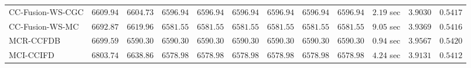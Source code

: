 \begin{table}[H]
\begin{tabular}{lrrrrrrrrrrr}
    CC-Fusion-WS-CGC & $      6609.94$ & $      6604.73$ & $      6596.94$ & $      6596.94$ & $      6596.94$ & $      6596.94$ & $      6596.94$ & $      6596.94$ & $         2.19$ sec    & $       3.9030$  & $       0.5417$ \\ 
     CC-Fusion-WS-MC & $      6692.87$ & $      6619.96$ & $      6581.55$ & $      6581.55$ & $      6581.55$ & $      6581.55$ & $      6581.55$ & $      6581.55$ & $         9.05$ sec    & $       3.9369$  & $       0.5416$ \\ 
\cmidrule{1-1} 
           MCR-CCFDB & $      6699.59$ & $      6590.30$ & $      6590.30$ & $      6590.30$ & $      6590.30$ & $      6590.30$ & $      6590.30$ & $      6590.30$ & $         0.94$ sec    & $       3.9567$  & $       0.5420$ \\ 
\cmidrule{1-1} 
           MCI-CCIFD & $      6803.74$ & $      6638.86$ & $      6578.98$ & $      6578.98$ & $      6578.98$ & $      6578.98$ & $      6578.98$ & $      6578.98$ & $         4.24$ sec    & $       3.9131$  & $       0.5412$ \\ 
\bottomrule
\end{tabular}
\end{table}

